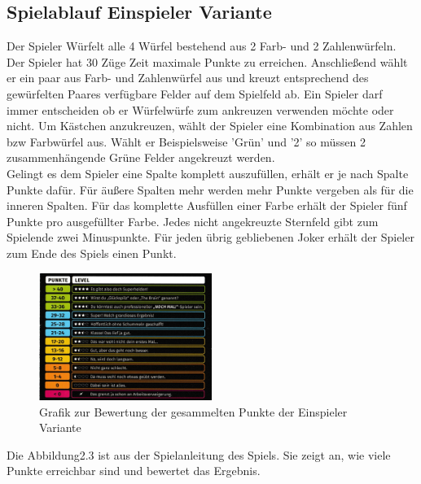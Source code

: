 \subsection{Spielablauf Einspieler Variante}
Der Spieler Würfelt alle 4 Würfel bestehend aus 2 Farb- und 2 Zahlenwürfeln.
Der Spieler hat 30 Züge Zeit maximale Punkte zu erreichen.
Anschließend wählt er ein paar aus Farb- und Zahlenwürfel aus und kreuzt entsprechend des gewürfelten Paares verfügbare Felder auf dem Spielfeld ab.
Ein Spieler darf immer entscheiden ob er Würfelwürfe zum ankreuzen verwenden möchte oder nicht.
Um Kästchen anzukreuzen, wählt der Spieler eine Kombination aus Zahlen bzw Farbwürfel aus. Wählt er Beispielsweise 'Grün' und '2' so müssen 2 zusammenhängende Grüne Felder angekreuzt werden. \\
Gelingt es dem  Spieler eine Spalte komplett auszufüllen, erhält er je nach Spalte Punkte dafür. Für äußere Spalten mehr werden mehr Punkte vergeben als für die inneren Spalten.
Für das komplette Ausfüllen einer Farbe erhält der Spieler fünf Punkte pro ausgefüllter Farbe.
Jedes nicht angekreuzte Sternfeld gibt zum Spielende zwei Minuspunkte.
Für jeden übrig gebliebenen Joker erhält der Spieler zum Ende des Spiels einen Punkt.

\begin{figure}[!h]
	\centering
	\includegraphics[width=0.5\textwidth]{Bilder/Punkte.jpeg}
	\caption{Grafik zur Bewertung der gesammelten Punkte der Einspieler Variante}
\end{figure}

Die Abbildung2.3 ist aus der Spielanleitung des Spiels. Sie zeigt an, wie viele Punkte erreichbar sind und bewertet das Ergebnis.
\newpage










